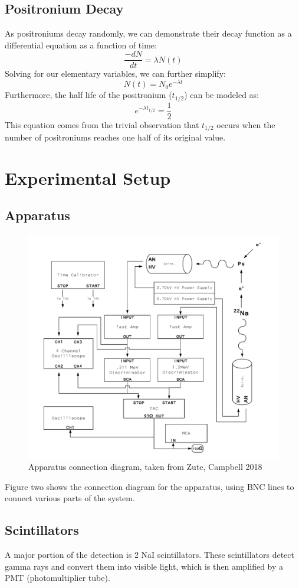 \documentclass[10pt,letterpaper]{article}
\begin{document}
\subsection{Positronium Decay}
As positroniums decay randomly, we can demonstrate their decay function as a differential equation as a function
of time: $$\frac{-dN}{dt} = \lambda N(t)$$
Solving for our elementary variables, we can further simplify:
$$N(t) = N_0e^{-\lambda t}$$
Furthermore, the half life of the positronium ($t_{1/2}$) can be modeled as: $$e^{-\lambda t_{1/2}} = \frac{1}{2}$$
This equation comes from the trivial observation that $t_{1/2}$ occurs when the number of positroniums reaches one half of its original value.
\section{Experimental Setup}
\subsection{Apparatus}
\begin{figure}[!htbp]
    \begin{center}
        \includegraphics[width=4.5in]{apparatus.png}
        \caption{Apparatus connection diagram, taken from Zute, Campbell 2018}
    \end{center}
\end{figure}
Figure two shows the connection diagram for the apparatus, using BNC lines to connect various parts of the system.
\subsection{Scintillators}
A major portion of the detection is 2 NaI scintillators. These scintillators detect gamma rays and convert them into 
visible light, which is then amplified by a PMT (photomultiplier tube).
\end{document}
